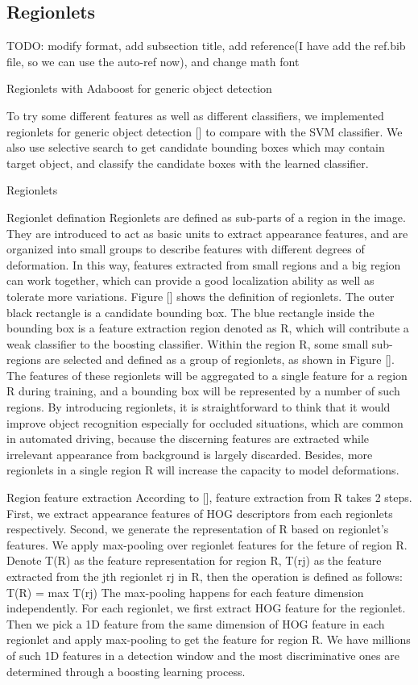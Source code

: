 \documentclass{article} %
\begin{document}
\subsection{Regionlets}

TODO: modify format, add subsection title, add reference(I have add the ref.bib file, so we can use the auto-ref now), and change math font

Regionlets with Adaboost for generic object detection
 
To try some different features as well as different classifiers, we implemented regionlets for generic object detection [] to compare with the SVM classifier. We also use selective search to get candidate bounding boxes which may contain target object, and classify the candidate boxes with the learned classifier.
 
Regionlets
 
Regionlet defination
Regionlets are defined as sub-parts of a region in the image. They are introduced to act as basic units to extract appearance features, and are organized into small groups to describe features with different degrees of deformation. In this way, features extracted from small regions and a big region can work together, which can provide a good localization ability as well as tolerate more variations.
Figure [] shows the definition of regionlets. The outer black rectangle is a candidate bounding box. The blue rectangle inside the bounding box is a feature extraction region denoted as R, which will contribute a weak classifier to the boosting classifier. Within the region R, some small sub-regions are selected and defined as a group of regionlets, as shown in Figure []. The features of these regionlets will be aggregated to a single feature for a region R during training, and a bounding box will be represented by a number of such regions.
By introducing regionlets, it is straightforward to think that it would improve object recognition especially for occluded situations, which are common in automated driving, because the discerning features are extracted while irrelevant appearance from background is largely discarded. Besides, more regionlets in a single region R will increase the capacity to model deformations.
 
Region feature extraction
According to [], feature extraction from R takes 2 steps. First, we extract appearance features of HOG descriptors from each regionlets respectively. Second, we generate the representation of R based on regionlet’s features. We apply max-pooling over regionlet features for the feture of region R. Denote T(R) as the feature representation for region R, T(rj) as the feature extracted from the jth regionlet rj in R, then the operation is defined as follows:
T(R) = max T(rj)
The max-pooling happens for each feature dimension independently. For each regionlet, we first extract HOG feature for the regionlet. Then we pick a 1D feature from the same dimension of HOG feature in each regionlet and apply max-pooling to get the feature for region R. We have millions of such 1D features in a detection window and the most discriminative ones are determined through a boosting learning process.
 
\end{document}
